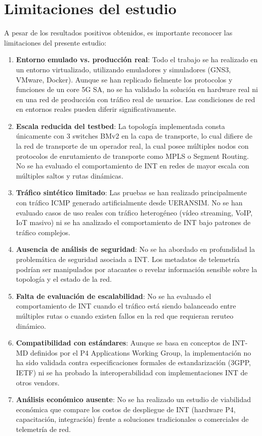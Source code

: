 \section{Limitaciones del estudio}

A pesar de los resultados positivos obtenidos, es importante reconocer las limitaciones del presente estudio:

\begin{enumerate}
    \item \textbf{Entorno emulado vs. producción real}: Todo el trabajo se ha realizado en un entorno virtualizado, utilizando emuladores y simuladores (GNS3, VMware, Docker). Aunque se han replicado fielmente los protocolos y funciones de un core 5G SA, no se ha validado la solución en hardware real ni en una red de producción con tráfico real de usuarios. Las condiciones de red en entornos reales pueden diferir significativamente.
    
    \item \textbf{Escala reducida del testbed}: La topología implementada consta únicamente con 3 switches BMv2 en la capa de transporte, lo cual difiere de la red de transporte de un operador real, la cual posee múltiples nodos con protocolos de enrutamiento de transporte como MPLS o Segment Routing. No se ha evaluado el comportamiento de INT en redes de mayor escala con múltiples saltos y rutas dinámicas. 
    
    \item \textbf{Tráfico sintético limitado}: Las pruebas se han realizado principalmente con tráfico ICMP generado artificialmente desde UERANSIM. No se han evaluado casos de uso reales con tráfico heterogéneo (vídeo streaming, VoIP, IoT masivo) ni se ha analizado el comportamiento de INT bajo patrones de tráfico complejos.
    
    \item \textbf{Ausencia de análisis de seguridad}: No se ha abordado en profundidad la problemática de seguridad asociada a INT. Los metadatos de telemetría podrían ser manipulados por atacantes o revelar información sensible sobre la topología y el estado de la red.
    
    \item \textbf{Falta de evaluación de escalabilidad}: No se ha evaluado el comportamiento de INT cuando el tráfico está siendo balanceado entre múltiples rutas o cuando existen fallos en la red que requieran reruteo dinámico.
    
    \item \textbf{Compatibilidad con estándares}: Aunque se basa en conceptos de INT-MD definidos por el P4 Applications Working Group, la implementación no ha sido validada contra especificaciones formales de estandarización (3GPP, IETF) ni se ha probado la interoperabilidad con implementaciones INT de otros vendors.
    
    \item \textbf{Análisis económico ausente}: No se ha realizado un estudio de viabilidad económica que compare los costos de despliegue de INT (hardware P4, capacitación, integración) frente a soluciones tradicionales o comerciales de telemetría de red.
\end{enumerate}

